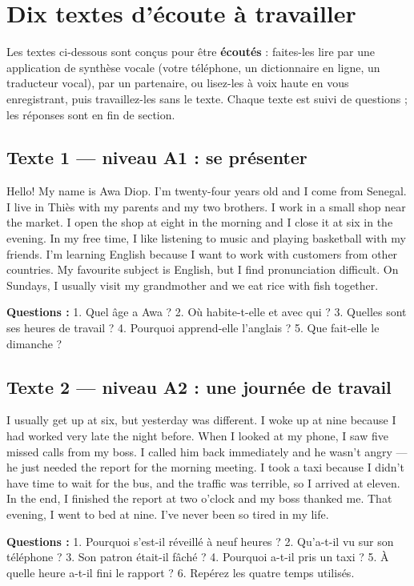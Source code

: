 \section{Dix textes d'écoute à travailler}
Les textes ci-dessous sont conçus pour être \textbf{écoutés} : faites-les lire par une
application de synthèse vocale (votre téléphone, un dictionnaire en ligne, un traducteur
vocal), par un partenaire, ou lisez-les à voix haute en vous enregistrant, puis travaillez-les
sans le texte. Chaque texte est suivi de questions ; les réponses sont en fin de section.

\subsection{Texte 1 --- niveau A1 : se présenter}
\begin{dialoguebox}
\begin{anglais}
Hello! My name is Awa Diop. I'm twenty-four years old and I come from Senegal. I live in
Thiès with my parents and my two brothers. I work in a small shop near the market. I open
the shop at eight in the morning and I close it at six in the evening. In my free time, I
like listening to music and playing basketball with my friends. I'm learning English because
I want to work with customers from other countries. My favourite subject is English, but I
find pronunciation difficult. On Sundays, I usually visit my grandmother and we eat rice
with fish together.
\end{anglais}
\end{dialoguebox}
\textbf{Questions :} 1. Quel âge a Awa ? 2. Où habite-t-elle et avec qui ?
3. Quelles sont ses heures de travail ? 4. Pourquoi apprend-elle l'anglais ?
5. Que fait-elle le dimanche ?

\subsection{Texte 2 --- niveau A2 : une journée de travail}
\begin{dialoguebox}
\begin{anglais}
I usually get up at six, but yesterday was different. I woke up at nine because I had worked
very late the night before. When I looked at my phone, I saw five missed calls from my boss.
I called him back immediately and he wasn't angry --- he just needed the report for the
morning meeting. I took a taxi because I didn't have time to wait for the bus, and the
traffic was terrible, so I arrived at eleven. In the end, I finished the report at two
o'clock and my boss thanked me. That evening, I went to bed at nine. I've never been so
tired in my life.
\end{anglais}
\end{dialoguebox}
\textbf{Questions :} 1. Pourquoi s'est-il réveillé à neuf heures ? 2. Qu'a-t-il vu sur son
téléphone ? 3. Son patron était-il fâché ? 4. Pourquoi a-t-il pris un taxi ?
5. À quelle heure a-t-il fini le rapport ? 6. Repérez les quatre temps utilisés.

